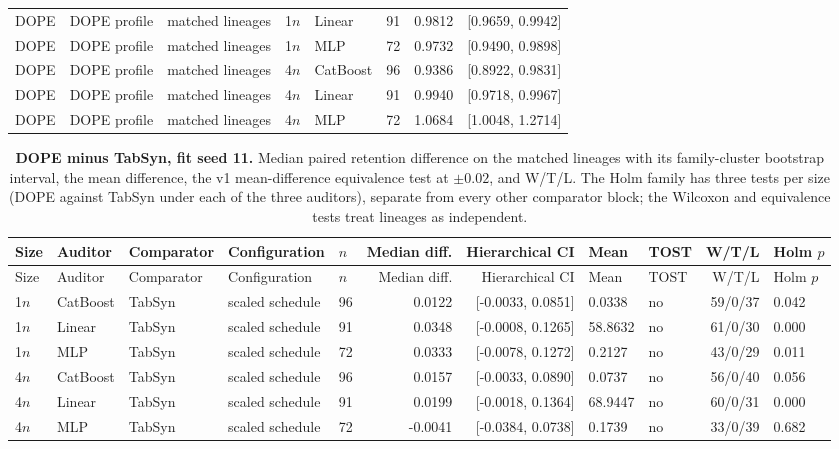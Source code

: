\begin{longtable}{lllllrrr}
DOPE & DOPE profile & matched lineages & 1$n$ & Linear & 91 & 0.9812 & [0.9659, 0.9942] \\
DOPE & DOPE profile & matched lineages & 1$n$ & MLP & 72 & 0.9732 & [0.9490, 0.9898] \\
DOPE & DOPE profile & matched lineages & 4$n$ & CatBoost & 96 & 0.9386 & [0.8922, 0.9831] \\
DOPE & DOPE profile & matched lineages & 4$n$ & Linear & 91 & 0.9940 & [0.9718, 0.9967] \\
DOPE & DOPE profile & matched lineages & 4$n$ & MLP & 72 & 1.0684 & [1.0048, 1.2714] \\
\bottomrule
\end{longtable}
\begin{longtable}{lllllrrllrl}
\caption{\textbf{DOPE minus TabSyn, fit seed 11.} Median paired retention difference on the matched lineages with its family-cluster bootstrap interval, the mean difference, the v1 mean-difference equivalence test at $\pm 0.02$, and W/T/L. The Holm family has three tests per size (DOPE against TabSyn under each of the three auditors), separate from every other comparator block; the Wilcoxon and equivalence tests treat lineages as independent.}\label{tab:review-tabsyn-contrasts}\\
\toprule
Size & Auditor & Comparator & Configuration & $n$ & Median diff. & Hierarchical CI & Mean & TOST & W/T/L & Holm $p$ \\
\midrule
\endfirsthead
\toprule
Size & Auditor & Comparator & Configuration & $n$ & Median diff. & Hierarchical CI & Mean & TOST & W/T/L & Holm $p$ \\
\midrule
\endhead
1$n$ & CatBoost & TabSyn & scaled schedule & 96 & 0.0122 & [-0.0033, 0.0851] & 0.0338 & no & 59/0/37 & 0.042 \\
1$n$ & Linear & TabSyn & scaled schedule & 91 & 0.0348 & [-0.0008, 0.1265] & 58.8632 & no & 61/0/30 & 0.000 \\
1$n$ & MLP & TabSyn & scaled schedule & 72 & 0.0333 & [-0.0078, 0.1272] & 0.2127 & no & 43/0/29 & 0.011 \\
4$n$ & CatBoost & TabSyn & scaled schedule & 96 & 0.0157 & [-0.0033, 0.0890] & 0.0737 & no & 56/0/40 & 0.056 \\
4$n$ & Linear & TabSyn & scaled schedule & 91 & 0.0199 & [-0.0018, 0.1364] & 68.9447 & no & 60/0/31 & 0.000 \\
4$n$ & MLP & TabSyn & scaled schedule & 72 & -0.0041 & [-0.0384, 0.0738] & 0.1739 & no & 33/0/39 & 0.682 \\
\bottomrule
\end{longtable}

